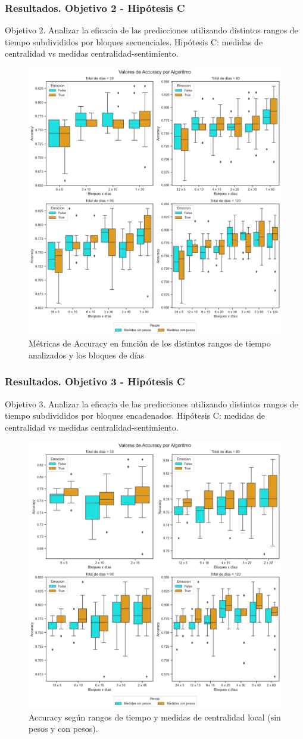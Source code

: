 \documentclass{beamer}
\begin{document}
\begin{frame}
	\frametitle{Resultados. Objetivo 2 - Hipótesis C}
	\begin{block}{Objetivo 2. Analizar la eficacia de las predicciones utilizando distintos rangos de tiempo subdivididos por bloques secuenciales.}
		Hipótesis C: medidas de centralidad vs medidas centralidad-sentimiento.
	\end{block}
	
\begin{figure}[H]
	\centering
	\includegraphics[width=0.45\linewidth]{figs/cap6/figura_64}
	\caption{Métricas de Accuracy en función de los distintos rangos de tiempo analizados y los bloques de días}
	\label{fig:figura58}
\end{figure}


\end{frame}

\begin{frame}
	\frametitle{Resultados. Objetivo 3 - Hipótesis C}
	\begin{block}{Objetivo 3. Analizar la eficacia de las predicciones utilizando distintos rangos de tiempo subdivididos por bloques encadenados.}
		Hipótesis C: medidas de centralidad vs medidas centralidad-sentimiento.
	\end{block}
	
\begin{figure}[H]
	\centering
	\includegraphics[width=0.45\linewidth]{figs/cap6/figura_122}
	\caption{Accuracy según rangos de tiempo y medidas de centralidad local (sin pesos y con pesos).}
	
	\label{fig:figura121}
\end{figure}

\end{frame}
\end{document}
